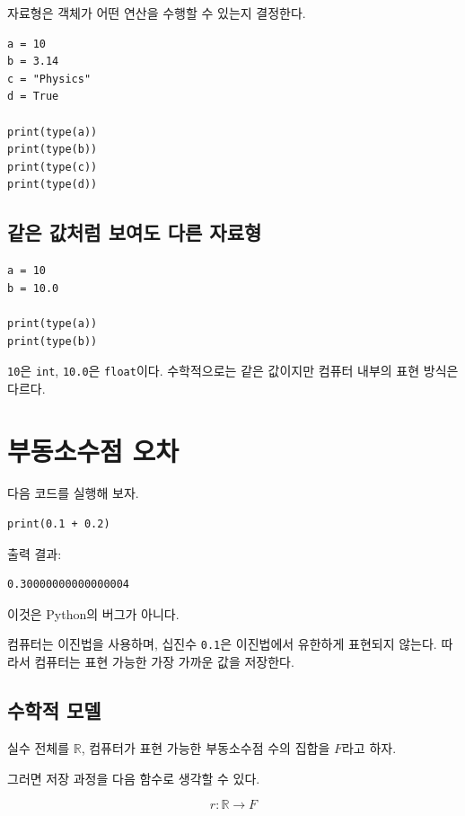 \documentclass[11pt,a4paper]{article}
\begin{document}
자료형은 객체가 어떤 연산을 수행할 수 있는지 결정한다.

\begin{lstlisting}
a = 10
b = 3.14
c = "Physics"
d = True

print(type(a))
print(type(b))
print(type(c))
print(type(d))
\end{lstlisting}

\subsection{같은 값처럼 보여도 다른 자료형}

\begin{lstlisting}
a = 10
b = 10.0

print(type(a))
print(type(b))
\end{lstlisting}

\texttt{10}은 \texttt{int}, \texttt{10.0}은 \texttt{float}이다.
수학적으로는 같은 값이지만 컴퓨터 내부의 표현 방식은 다르다.

\section{부동소수점 오차}

다음 코드를 실행해 보자.

\begin{lstlisting}
print(0.1 + 0.2)
\end{lstlisting}

출력 결과:

\begin{verbatim}
0.30000000000000004
\end{verbatim}

이것은 Python의 버그가 아니다.

컴퓨터는 이진법을 사용하며, 십진수 \texttt{0.1}은 이진법에서 유한하게 표현되지 않는다.
따라서 컴퓨터는 표현 가능한 가장 가까운 값을 저장한다.

\subsection{수학적 모델}

실수 전체를 \(\mathbb{R}\), 컴퓨터가 표현 가능한 부동소수점 수의 집합을 \(F\)라고 하자.

그러면 저장 과정을 다음 함수로 생각할 수 있다.

\[
r:\mathbb{R}\rightarrow F
\]
\end{document}
